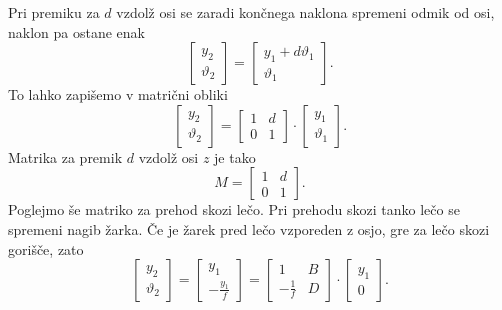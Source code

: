 Pri premiku za $d$ vzdolž osi se zaradi končnega naklona spremeni odmik od osi, naklon pa ostane enak
\begin{equation}
\left[\begin{array}{c}
y_{2}\\
\vartheta_{2}
\end{array}\right]=\left[\begin{array}{c}
y_{1}+d\vartheta_{1}\\
\vartheta_{1}
\end{array}\right].
\end{equation}
To lahko zapišemo v matrični obliki
\begin{equation}
\left[\begin{array}{c}
y_{2}\\
\vartheta_{2}
\end{array}\right]=\left[\begin{array}{cc}
1 & d\\
0 & 1
\end{array}\right]\cdot\left[\begin{array}{c}
y_{1}\\
\vartheta_{1}
\end{array}\right].
\end{equation}
Matrika za premik $d$ vzdolž osi $z$ je tako
\begin{equation}
M= \left[\begin{array}{cc}
1 & d\\
0 & 1
\end{array}\right].
\end{equation}
Poglejmo še matriko za prehod skozi lečo. 
Pri prehodu skozi tanko lečo se spremeni nagib žarka. Če je žarek pred
lečo vzporeden z osjo, gre za lečo skozi gorišče, zato 
\begin{equation}
\left[\begin{array}{c}
y_{2}\\
\vartheta_{2}
\end{array}\right]=\left[\begin{array}{c}
y_{1}\\
-\frac{y_{1}}{f}
\end{array}\right]=\left[\begin{array}{cc}
1 & B\\
-\frac{1}{f} & D
\end{array}\right]\cdot\left[\begin{array}{c}
y_{1}\\
0
\end{array}\right].
\end{equation}
